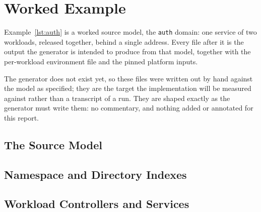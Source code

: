 
\section{Worked Example}
\label{app:rendered}

Example~\ref{lst:auth} is a worked source model, the \texttt{auth} domain: one
service of two workloads, released together, behind a single address. Every file
after it is the output the generator is intended to produce from that model,
together with the per-workload environment file and the pinned platform inputs.

The generator does not exist yet, so these files were written out by hand
against the model as specified; they are the target the implementation will be
measured against rather than a transcript of a run. They are shaped exactly as
the generator must write them: no commentary, and nothing added or annotated for
this report.

\subsection{The Source Model}



\subsection{Namespace and Directory Indexes}





\subsection{Workload Controllers and Services}





